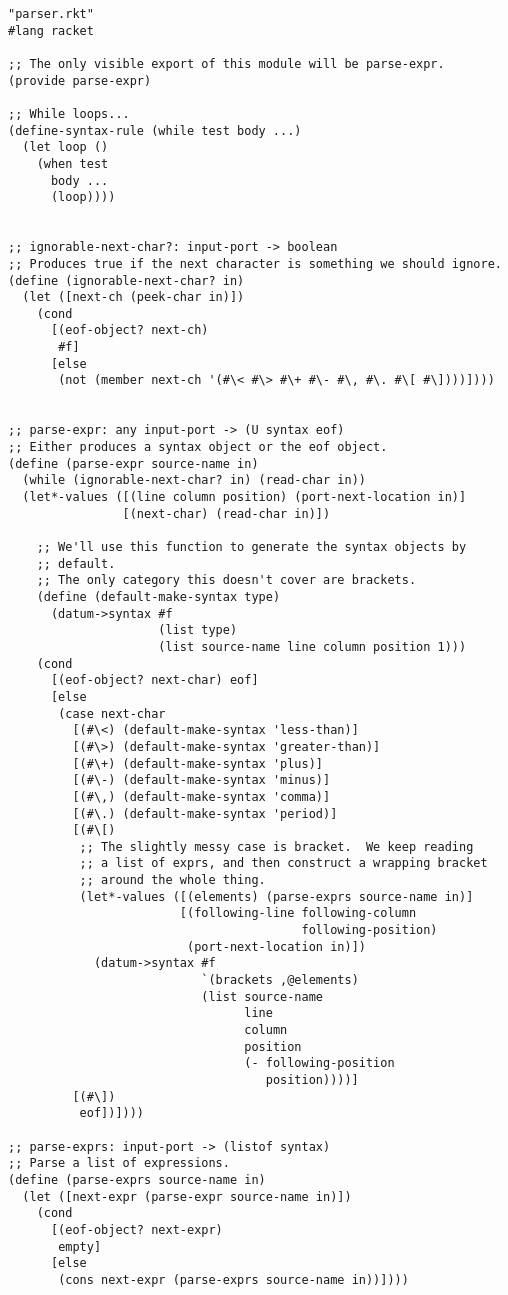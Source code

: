 \documentclass{article}
\begin{document}
\begin{verbatim}
"parser.rkt"
#lang racket
 
;; The only visible export of this module will be parse-expr.
(provide parse-expr)
 
;; While loops...
(define-syntax-rule (while test body ...)
  (let loop ()
    (when test
      body ...
      (loop))))
 
 
;; ignorable-next-char?: input-port -> boolean
;; Produces true if the next character is something we should ignore.
(define (ignorable-next-char? in)
  (let ([next-ch (peek-char in)])
    (cond
      [(eof-object? next-ch)
       #f]
      [else
       (not (member next-ch '(#\< #\> #\+ #\- #\, #\. #\[ #\])))])))
 
 
;; parse-expr: any input-port -> (U syntax eof)
;; Either produces a syntax object or the eof object.
(define (parse-expr source-name in)
  (while (ignorable-next-char? in) (read-char in))
  (let*-values ([(line column position) (port-next-location in)]
                [(next-char) (read-char in)])
 
    ;; We'll use this function to generate the syntax objects by
    ;; default.
    ;; The only category this doesn't cover are brackets.
    (define (default-make-syntax type)
      (datum->syntax #f
                     (list type)
                     (list source-name line column position 1)))
    (cond
      [(eof-object? next-char) eof]
      [else
       (case next-char
         [(#\<) (default-make-syntax 'less-than)]
         [(#\>) (default-make-syntax 'greater-than)]
         [(#\+) (default-make-syntax 'plus)]
         [(#\-) (default-make-syntax 'minus)]
         [(#\,) (default-make-syntax 'comma)]
         [(#\.) (default-make-syntax 'period)]
         [(#\[)
          ;; The slightly messy case is bracket.  We keep reading
          ;; a list of exprs, and then construct a wrapping bracket
          ;; around the whole thing.
          (let*-values ([(elements) (parse-exprs source-name in)]
                        [(following-line following-column
                                         following-position)
                         (port-next-location in)])
            (datum->syntax #f
                           `(brackets ,@elements)
                           (list source-name
                                 line
                                 column
                                 position
                                 (- following-position
                                    position))))]
         [(#\])
          eof])])))
 
;; parse-exprs: input-port -> (listof syntax)
;; Parse a list of expressions.
(define (parse-exprs source-name in)
  (let ([next-expr (parse-expr source-name in)])
    (cond
      [(eof-object? next-expr)
       empty]
      [else
       (cons next-expr (parse-exprs source-name in))])))
\end{verbatim}
\end{document}
